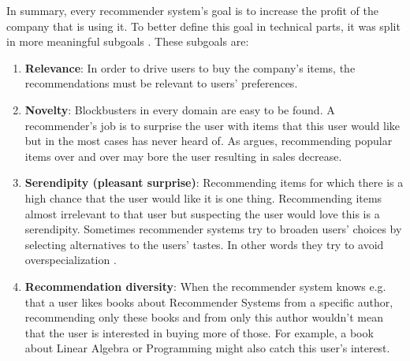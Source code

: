 In summary, every recommender system's goal is to increase the profit of the
company that is using it. To better define this goal in technical parts,
it was split in more meaningful subgoals \citep{Aggarwal}.
These subgoals are:

\begin{enumerate}
  \item \textbf{Relevance}: In order to drive users to buy the company's items, the
  recommendations must be relevant to users' preferences.
  \item \textbf{Novelty}: Blockbusters in every domain are easy to be found.
  A recommender's job is to surprise the user with items that this user would
  like but in the most cases has never heard of. As \citep{Fleder} argues,
  recommending popular items over and over may bore the user resulting in
  sales decrease.
  \item \textbf{Serendipity (pleasant surprise)}: Recommending items for which there
  is a high chance that the user would like it is one thing. Recommending items
  almost irrelevant to that user but suspecting the user would love this is a
  serendipity. Sometimes recommender systems try to broaden users' choices
  by selecting alternatives to the users' tastes. In other words they try to
  avoid overspecialization \citep{Jannach}.
  \item \textbf{Recommendation diversity}: When the recommender system knows
  e.g. that a user likes books about Recommender Systems from a specific author,
  recommending only these books and from only this author wouldn't mean that the
  user is interested in buying more of those. For example, a book about
  Linear Algebra or Programming might also catch this user's interest.
\end{enumerate}

